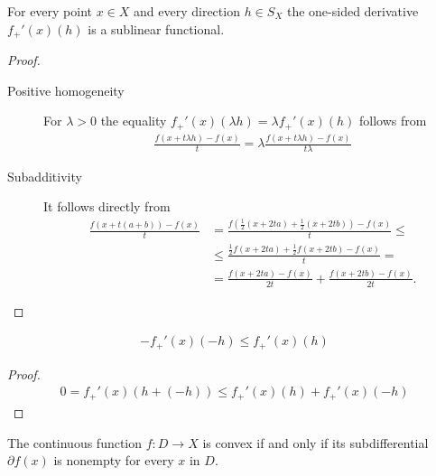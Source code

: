 \begin{proposition}\label{thm:convex_one_sided_derivatives_sublinear}
  For every point $x \in X$ and every direction $h \in S_X$ the one-sided derivative $f_+'(x)(h)$ is a sublinear functional.
\end{proposition}
\begin{proof}\mbox{} %
  \begin{description}
    \item[Positive homogeneity] For $\lambda > 0$ the equality $f_+'(x)(\lambda h) = \lambda f_+'(x)(h)$ follows from
    \begin{align*}
      \frac {f(x + t \lambda h) - f(x)} t
      =
      \lambda \frac {f(x + t \lambda h) - f(x)} {t \lambda}
    \end{align*}

    \item[Subadditivity] It follows directly from
    \begin{align*}
      \frac {f(x + t(a + b)) - f(x)} t
      &=
      \frac {f(\tfrac 1 2 (x + 2ta) + \tfrac 1 2 (x + 2tb)) - f(x)} t
      \leq \\ &\leq
      \frac {\tfrac 1 2 f(x + 2ta) + \tfrac 1 2 f(x + 2tb) - f(x)} t
      = \\ &=
      \frac {f(x + 2ta) - f(x)} {2t} + \frac {f(x + 2tb) - f(x)} {2t}.
    \end{align*}
  \end{description}
\end{proof}

\begin{corollary}\label{thm:convex_one_sided_derivative_negative_inequality}
  \begin{align*}
    -f_+'(x)(-h) \leq f_+'(x)(h)
  \end{align*}
\end{corollary}
\begin{proof}
  \begin{align*}
      0 = f_+'(x)(h + (-h)) \leq f_+'(x)(h) + f_+'(x)(-h)
  \end{align*}
\end{proof}

\begin{proposition}\label{thm:convex_iff_subdifferential_nonempty}
  The continuous function $f: D \to X$ is convex if and only if its subdifferential $\partial f(x)$ is nonempty for every $x$ in $D$.
\end{proposition}

